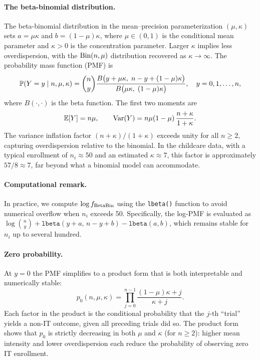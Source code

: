 \paragraph{The beta-binomial distribution.}
The beta-binomial distribution in the mean--precision parameterization
\citep{Griffiths1973,Prentice1986}
$(\mu,\kappa)$ sets $a = \mu\kappa$ and $b = (1-\mu)\kappa$, where
$\mu \in (0,1)$ is the conditional mean parameter and $\kappa > 0$ is the
concentration parameter. Larger $\kappa$ implies less overdispersion, with the
$\operatorname{Bin}(n,\mu)$ distribution recovered as $\kappa \to \infty$. The probability
mass function (PMF) is
\begin{equation}\label{eq:bb-pmf}
  \mathbb{P}(Y = y \mid n,\mu,\kappa)
  = \binom{n}{y}
    \frac{B\bigl(y + \mu\kappa,\; n - y + (1-\mu)\kappa\bigr)}
         {B\bigl(\mu\kappa,\;(1-\mu)\kappa\bigr)},
  \quad y = 0,1,\ldots,n,
\end{equation}
where $B(\cdot,\cdot)$ is the beta function. The first two moments are
\begin{equation}\label{eq:bb-moments}
  \mathbb{E}[Y] = n\mu, \qquad
  \operatorname*{Var}(Y) = n\mu(1-\mu)\,\frac{n + \kappa}{1 + \kappa}.
\end{equation}
The variance inflation factor $(n+\kappa)/(1+\kappa)$ exceeds unity for all
$n \ge 2$, capturing overdispersion relative to the binomial. In the
childcare data, with a typical enrollment of $n_i \approx 50$ and an
estimated $\kappa \approx 7$, this factor is approximately $57/8 \approx 7$,
far beyond what a binomial model can accommodate.

\paragraph{Computational remark.}
In practice, we compute $\log f_{\operatorname{BetaBin}}$ using the
\texttt{lbeta()} function to avoid numerical overflow when $n_i$
exceeds 50. Specifically, the log-PMF is evaluated as
$\log\binom{n}{y} + \texttt{lbeta}(y+a,\,n-y+b) - \texttt{lbeta}(a,b)$,
which remains stable for $n_i$ up to several hundred.

\paragraph{Zero probability.}
At $y = 0$ the PMF simplifies to a product form
that is both interpretable and numerically stable:
\begin{equation}\label{eq:p0}
  p_0(n,\mu,\kappa)
  = \prod_{j=0}^{n-1} \frac{(1-\mu)\kappa + j}{\kappa + j}.
\end{equation}
Each factor in the product is the conditional probability that the $j$-th
``trial'' yields a non-IT outcome, given all preceding trials did so. The
product form shows that $p_0$ is strictly decreasing in both $\mu$ and $\kappa$
(for $n \ge 2$): higher mean intensity and lower overdispersion each reduce the
probability of observing zero IT enrollment.

